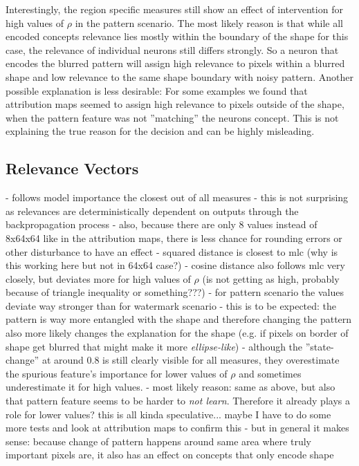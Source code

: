 Interestingly, the region specific measures still show an effect of intervention for high values of $\rho$ in the pattern scenario. The most likely reason is that while all encoded concepts relevance lies mostly within the boundary of the shape for this case, the relevance of individual neurons still differs strongly. So a neuron that encodes the blurred pattern will assign high relevance to pixels within a blurred shape and low relevance to the same shape boundary with noisy pattern. 
Another possible explanation is less desirable: For some examples we found that attribution maps seemed to assign high relevance to pixels outside of the shape, when the pattern feature was not ''matching'' the neurons concept. This is not explaining the true reason for the decision and can be highly misleading. 


\subsection{Relevance Vectors}
- follows model importance the closest out of all measures
- this is not surprising as relevances are deterministically dependent on outputs through the backpropagation process
- also, because there are only 8 values instead of 8x64x64 like in the attribution maps, there is less chance for rounding errors or other disturbance to have an effect
- squared distance is closest to mlc (why is this working here but not in 64x64 case?)
- cosine distance also follows mlc very closely, but deviates more for high values of $\rho$ (is not getting as high, probably because of triangle inequality or something???) 
- for pattern scenario the values deviate way stronger than for watermark scenario
- this is to be expected: the pattern is way more entangled with the shape and therefore changing the pattern also more likely changes the explanation for the shape (e.g. if pixels on border of shape get blurred that might make it more \textit{ellipse-like})
- although the ''state-change'' at around 0.8 is still clearly visible for all measures, they overestimate the spurious feature's importance for lower values of $\rho$ and sometimes underestimate it for high values.
- most likely reason: same as above, but also that pattern feature seems to be harder to \textit{not learn}. Therefore it already plays a role for lower values? this is all kinda speculative... maybe I have to do some more tests and look at attribution maps to confirm this
- but in general it makes sense: because change of pattern happens around same area where truly important pixels are, it also has an effect on concepts that only encode shape


